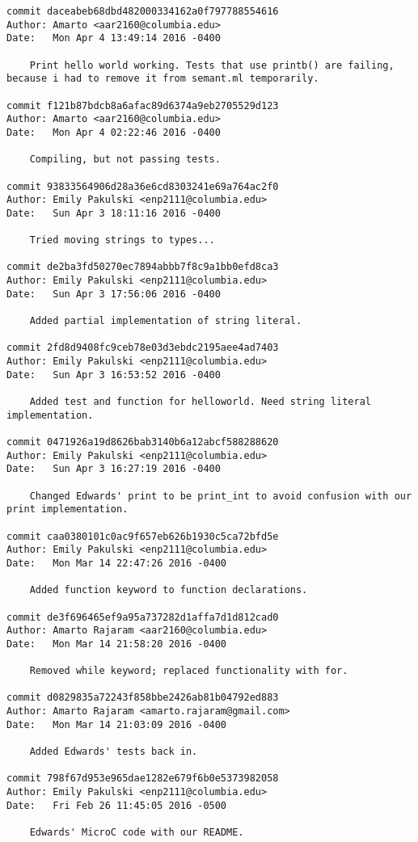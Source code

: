 \begin{lstlisting}[backgroundcolor=\color{white}]
commit daceabeb68dbd482000334162a0f797788554616
Author: Amarto <aar2160@columbia.edu>
Date:   Mon Apr 4 13:49:14 2016 -0400

    Print hello world working. Tests that use printb() are failing, because i had to remove it from semant.ml temporarily.

commit f121b87bdcb8a6afac89d6374a9eb2705529d123
Author: Amarto <aar2160@columbia.edu>
Date:   Mon Apr 4 02:22:46 2016 -0400

    Compiling, but not passing tests.

commit 93833564906d28a36e6cd8303241e69a764ac2f0
Author: Emily Pakulski <enp2111@columbia.edu>
Date:   Sun Apr 3 18:11:16 2016 -0400

    Tried moving strings to types...

commit de2ba3fd50270ec7894abbb7f8c9a1bb0efd8ca3
Author: Emily Pakulski <enp2111@columbia.edu>
Date:   Sun Apr 3 17:56:06 2016 -0400

    Added partial implementation of string literal.

commit 2fd8d9408fc9ceb78e03d3ebdc2195aee4ad7403
Author: Emily Pakulski <enp2111@columbia.edu>
Date:   Sun Apr 3 16:53:52 2016 -0400

    Added test and function for helloworld. Need string literal implementation.

commit 0471926a19d8626bab3140b6a12abcf588288620
Author: Emily Pakulski <enp2111@columbia.edu>
Date:   Sun Apr 3 16:27:19 2016 -0400

    Changed Edwards' print to be print_int to avoid confusion with our print implementation.

commit caa0380101c0ac9f657eb626b1930c5ca72bfd5e
Author: Emily Pakulski <enp2111@columbia.edu>
Date:   Mon Mar 14 22:47:26 2016 -0400

    Added function keyword to function declarations.

commit de3f696465ef9a95a737282d1affa7d1d812cad0
Author: Amarto Rajaram <aar2160@columbia.edu>
Date:   Mon Mar 14 21:58:20 2016 -0400

    Removed while keyword; replaced functionality with for.

commit d0829835a72243f858bbe2426ab81b04792ed883
Author: Amarto Rajaram <amarto.rajaram@gmail.com>
Date:   Mon Mar 14 21:03:09 2016 -0400

    Added Edwards' tests back in.

commit 798f67d953e965dae1282e679f6b0e5373982058
Author: Emily Pakulski <enp2111@columbia.edu>
Date:   Fri Feb 26 11:45:05 2016 -0500

    Edwards' MicroC code with our README.

    \end{lstlisting}

